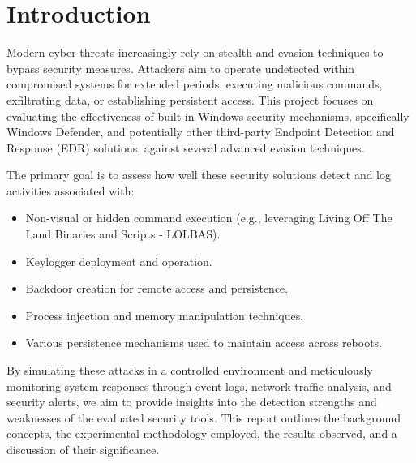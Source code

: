 \documentclass{ULBreport}
\begin{document}


\nocite{*}
\printbibliography[type=article,title=Articles]

\section*{Introduction}
Modern cyber threats increasingly rely on stealth and evasion techniques to bypass security measures. Attackers aim to operate undetected within compromised systems for extended periods, executing malicious commands, exfiltrating data, or establishing persistent access. This project focuses on evaluating the effectiveness of built-in Windows security mechanisms, specifically Windows Defender, and potentially other third-party Endpoint Detection and Response (EDR) solutions, against several advanced evasion techniques.

The primary goal is to assess how well these security solutions detect and log activities associated with:
\begin{itemize}
	\item Non-visual or hidden command execution (e.g., leveraging Living Off The Land Binaries and Scripts - LOLBAS).
	\item Keylogger deployment and operation.
	\item Backdoor creation for remote access and persistence.
	\item Process injection and memory manipulation techniques.
	\item Various persistence mechanisms used to maintain access across reboots.
\end{itemize}

By simulating these attacks in a controlled environment and meticulously monitoring system responses through event logs, network traffic analysis, and security alerts, we aim to provide insights into the detection strengths and weaknesses of the evaluated security tools. This report outlines the background concepts, the experimental methodology employed, the results observed, and a discussion of their significance.
\end{document}
